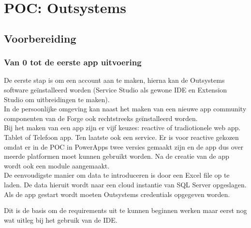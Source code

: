 
\chapter{POC: Outsystems}
\label{ch:outsystems-poc}



\section{Voorbereiding}

\subsection{Van 0 tot de eerste app uitvoering}

De eerste stap is om een account aan te maken, hierna kan de Outsystems software geïnstalleerd worden (Service Studio als gewone IDE en Extension Studio om uitbreidingen te maken).\\
In de persoonlijke omgeving kan naast het maken van een nieuwe app community componenten van de Forge ook rechtstreeks geïnstalleerd worden. \\
Bij het maken van een app zijn er vijf keuzes: reactive of tradiotionele web app. Tablet of Telefoon app. Ten laatste ook een service. Er is voor reactive gekozen omdat er in de POC in PowerApps twee versies gemaakt zijn en de app dus over meerde platformen moet kunnen gebruikt worden. Na de creatie van de app wordt ook een module aangemaakt.\\
De eenvoudigste manier om data te introduceren is door een Excel file op te laden. De data hieruit wordt naar een cloud instantie van SQL Server opgeslagen.\\
Als de app gestart wordt moeten Outsystems credentials opgegeven worden.

Dit is de basis om de requirements uit te kunnen beginnen werken maar eerst nog wat uitleg bij het gebruik van de IDE.

